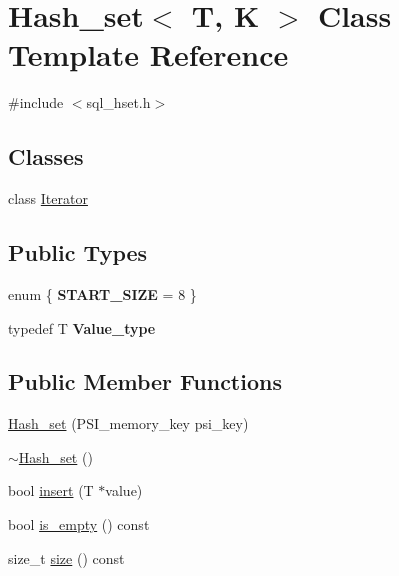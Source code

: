 \hypertarget{classHash__set}{}\section{Hash\+\_\+set$<$ T, K $>$ Class Template Reference}
\label{classHash__set}


{\ttfamily \#include $<$sql\+\_\+hset.\+h$>$}

\subsection*{Classes}
\begin{DoxyCompactItemize}
\item 
class \mbox{\hyperlink{classHash__set_1_1Iterator}{Iterator}}
\end{DoxyCompactItemize}
\subsection*{Public Types}
\begin{DoxyCompactItemize}
\item 
\mbox{\label{classHash__set_a9eb6cbec751a4982159e70310cda78ea}} 
enum \{ {\bfseries S\+T\+A\+R\+T\+\_\+\+S\+I\+ZE} = 8
 \}
\item 
\mbox{\label{classHash__set_a196f0fafe4c592464a67b4f9a915cc46}} 
typedef T {\bfseries Value\+\_\+type}
\end{DoxyCompactItemize}
\subsection*{Public Member Functions}
\begin{DoxyCompactItemize}
\item 
\mbox{\hyperlink{classHash__set_a18dac5297ce6dca1a333aca94a3b5bf5}{Hash\+\_\+set}} (P\+S\+I\+\_\+memory\+\_\+key psi\+\_\+key)
\item 
\mbox{\hyperlink{classHash__set_a8171c917e05408fae5e5a1b12d2b3011}{$\sim$\+Hash\+\_\+set}} ()
\item 
bool \mbox{\hyperlink{classHash__set_ae8cd34c7227a2fd2c288a687dad59fad}{insert}} (T $\ast$value)
\item 
bool \mbox{\hyperlink{classHash__set_a60a9d58549e8eee25c0f934b9a13ae5c}{is\+\_\+empty}} () const
\item 
size\+\_\+t \mbox{\hyperlink{classHash__set_af3f6728c422cebd67610c753a41d4231}{size}} () const
\end{DoxyCompactItemize}


